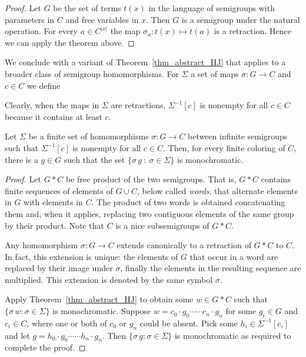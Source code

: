\begin{proof}
Let $G$ be the set of terms $t(x)$ in the language of semigroups 
with parameters in $C$ and free variables in $x$.
Then $G$ is a semigroup under the natural operation.
For every $a\in C^{|x|}$ the map $\sigma_a:t(x)\mapsto t(a)$ is a retraction.
Hence we can apply the theorem above.
\end{proof}

We conclude with a variant of Theorem~\ref{thm_abstract_HJ} that applies to 
a broader class of semigroup homomorphisms. 
%
For $\Sigma$ a set of maps $\sigma:G\to C$ and $c\in C$ we define 

\smallskip

Clearly, when the maps in $\Sigma$ are retractions, $\Sigma^{-1}[c]$ is nonempty for all $c\in C$ because it contains at least $c$.

\begin{HalesJewett}\label{thm_hom_HJ}
Let $\Sigma$ be a finite set of homomorphisms $\sigma:G\to C$ 
between infinite semigroups
such that $\Sigma^{-1}[c]$ is nonempty for all $c\in C$.
Then, for every finite coloring of $C$, there is a $g\in G$ such that the set 
$\{\sigma\,g\ :\ \sigma\in\Sigma\}$ is monochromatic.
\end{HalesJewett}

\begin{proof}
Let $G*C$ be free product of the two semigroups.
That is, $G*C$ contains finite sequences of elements of $G\cup C$, below called \textit{words}, that alternate elements in $G$ with elements in $C$.
The product of two words is obtained concatenating them and, when it applies, replacing two contiguous elements of the same group by their product.
Note that $C$ is a nice subsemigroups of $G*C$.

Any homomorphism $\sigma:G\to C$ extends canonically to a retraction of $G*C$ to $C$.
In fact, this extension is unique: the elements of $G$ that occur in a word are replaced by their image under $\sigma$, finally the elements in the resulting sequence are multiplied.
This extension is denoted by the same symbol $\sigma$.

Apply Theorem~\ref{thm_abstract_HJ} to obtain some $w\in G*C$ such that 
$\{\sigma \,w:\sigma\in\Sigma\}$ is monochromatic.
%
Suppose $w=c_0\cdot g_0\cdots\cdots c_n\cdot g_n$ for some $g_i\in G$ and $c_i\in C$, 
where one or both of $c_0$ or $g_n$ could be absent. Pick some $h_i\in\Sigma^{-1}[c_i]$ and 
let $g=h_0\cdot g_0\cdots\cdots h_n\cdot g_n$.
%
Then $\{\sigma\,g:\sigma\in\Sigma\}$ is monochromatic as required to complete the proof.
\end{proof}

